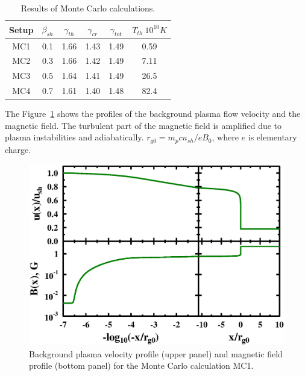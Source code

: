 \documentclass[a4paper]{jpconf}
\begin{document}
	\begin{table}[h!]
	\label{MC_calculations}
	\caption{Results of Monte Carlo calculations. }
	\begin{center}
		\begin{tabular}{|c | c| c| c| c| c| }
			\hline
			Setup  & ${\beta}_{sh}$ & ${\gamma}_{th}$ & ${\gamma}_{cr}$ & ${\gamma}_{tot}$ & $T_{th}\ 10^{10}K$ \\
			\hline
			MC1  & 0.1 & 1.66 & 1.43 & 1.49 & 0.59 \\
			MC2  & 0.3 & 1.66 & 1.42 & 1.49 & 7.11 \\
			MC3  & 0.5 & 1.64 & 1.41 & 1.49 & 26.5 \\
			MC4  & 0.7 & 1.61 & 1.40 & 1.48 & 82.4 \\
				
			\hline
		\end{tabular}
	\end{center}
    \end{table}


The Figure~\ref{u_B_eff_MC1} shows the profiles of the background plasma flow velocity and the magnetic field. The turbulent part of the magnetic field is amplified due to plasma instabilities and adiabatically. $r_{g0}=m_{p}cu_{sh}/eB_{0}$, where $e$ is elementary charge.
    
    
\begin{figure}[h!]
\begin{center}
\includegraphics[scale=0.5]{u_B_eff_MC1.eps}
\end{center}
\caption{Background plasma velocity profile (upper panel) and magnetic field profile (bottom
panel) for the Monte Carlo calculation MC1.}
\label{u_B_eff_MC1}
\end{figure}
\end{document}
